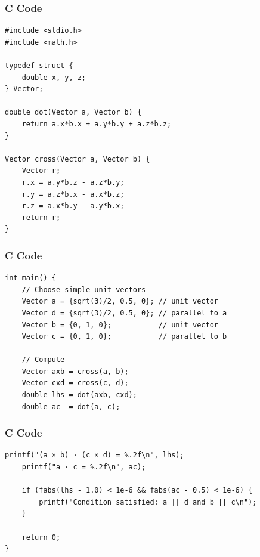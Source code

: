 \documentclass{beamer}
\begin{document}
\begin{frame}[fragile]
\frametitle{C Code}
\begin{lstlisting}
#include <stdio.h>
#include <math.h>

typedef struct {
    double x, y, z;
} Vector;

double dot(Vector a, Vector b) {
    return a.x*b.x + a.y*b.y + a.z*b.z;
}

Vector cross(Vector a, Vector b) {
    Vector r;
    r.x = a.y*b.z - a.z*b.y;
    r.y = a.z*b.x - a.x*b.z;
    r.z = a.x*b.y - a.y*b.x;
    return r;
}
\end{lstlisting}
\end{frame}

\begin{frame}[fragile]
\frametitle{C Code}
\begin{lstlisting}
int main() {
    // Choose simple unit vectors
    Vector a = {sqrt(3)/2, 0.5, 0}; // unit vector
    Vector d = {sqrt(3)/2, 0.5, 0}; // parallel to a
    Vector b = {0, 1, 0};           // unit vector
    Vector c = {0, 1, 0};           // parallel to b

    // Compute
    Vector axb = cross(a, b);
    Vector cxd = cross(c, d);
    double lhs = dot(axb, cxd);
    double ac  = dot(a, c);
\end{lstlisting}
\end{frame}

\begin{frame}[fragile]
\frametitle{C Code}
\begin{lstlisting}
printf("(a × b) · (c × d) = %.2f\n", lhs);
    printf("a · c = %.2f\n", ac);

    if (fabs(lhs - 1.0) < 1e-6 && fabs(ac - 0.5) < 1e-6) {
        printf("Condition satisfied: a || d and b || c\n");
    }

    return 0;
}
\end{lstlisting}
\end{frame}
\end{document}
